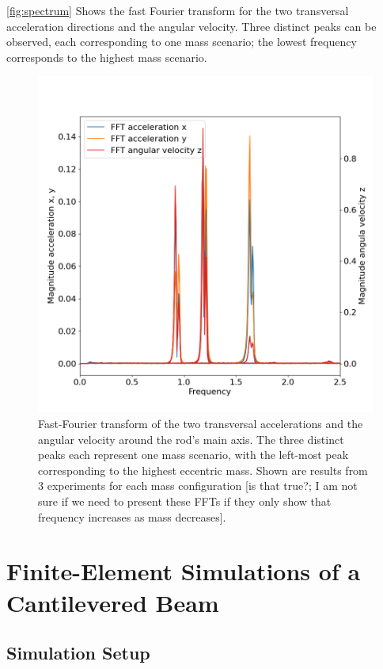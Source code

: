 \documentclass{article}
\begin{document}
\autoref{fig:spectrum} Shows the fast Fourier transform for the two transversal acceleration directions and the angular velocity. Three distinct peaks can be observed, each corresponding to one mass scenario; the lowest frequency corresponds to the highest mass scenario. 

\begin{figure}[ht]
    \centering
    \includegraphics[width=0.5\linewidth]{../results/experiment/spectrum.png}
    \caption{Fast-Fourier transform of the two transversal accelerations and the angular velocity around the rod's main axis. The three distinct peaks each represent one mass scenario, with the left-most peak corresponding to the highest eccentric mass. Shown are results from 3 experiments for each mass configuration [is that true?; I am not sure if we need to present these FFTs if they only show that frequency increases as mass decreases].}
    \label{fig:spectrum}
\end{figure}

\clearpage

\section{Finite-Element Simulations of a Cantilevered Beam}
\label{sec:simulations}

\subsection{Simulation Setup}
\end{document}
